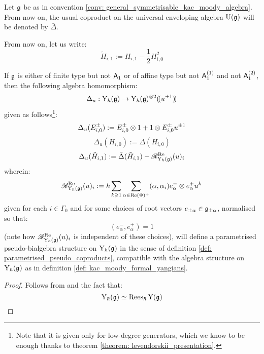             \begin{convention} \label{conv: universal_enveloping_algebra_coproduct}
                Let $\mathfrak{g}$ be as in convention \ref{conv: general_symmetrisable_kac_moody_algebra}. From now on, the usual coproduct on the universal enveloping algebra $\mathrm{U}(\mathfrak{g})$ will be denoted by $\bar{\Delta}$.
            \end{convention}
            \begin{convention}
                From now on, let us write:
                    $$\tilde{H}_{i, 1} := H_{i, 1} - \frac12 H_{i, 0}^2$$
            \end{convention}
            \begin{theorem} \label{theorem: parametrised_pseudo_coproduct_on_formal_yangians}
                If $\mathfrak{g}$ is either of finite type but not $\mathsf{A}_1$ or of affine type but not $\mathsf{A}_1^{(1)}$ and not $\mathsf{A}_1^{(2)}$, then the following algebra homomorphism:
                    $$\Delta_u: \rmY_{\hbar}(\g) \to \rmY_{\hbar}(\g)^{\tensor 2}(\!(u^{\pm 1})\!)$$
                given as follows\footnote{Note that it is given only for low-degree generators, which we know to be enough thanks to theorem \ref{theorem: levendorskii_presentation}.}:
                    $$\Delta_u(E_{i, 0}^{\pm}) := E_{i, 0}^{\pm} \tensor 1 + 1 \tensor E_{i, 0}^{\pm} u^{\pm 1}$$
                    $$\Delta_u(H_{i, 0}) := \bar{\Delta}(H_{i, 0})$$
                    $$\Delta_u(\tilde{H}_{i, 1}) := \bar{\Delta}(\tilde{H}_{i, 1}) - \mathscr{R}_{\mathrm{Y}_{\hbar}(\mathfrak{g})}^{\operatorname{Re}}(u)_i$$
                wherein:
                    $$\scrR_{\rmY_{\hbar}(\g)}^{\Re}(u)_i := \hbar \sum_{k \geq 1} \sum_{\alpha \in \Re(\Phi)^+} (\alpha, \alpha_i) e_{\alpha}^- \tensor e_{\alpha}^+ u^k$$
                given for each $i \in \Gamma_0$ and for some choices of root vectors $e_{\pm\alpha} \in \mathfrak{g}_{\pm\alpha}$, normalised so that:
                    $$(e_{\alpha}^-, e_{\alpha}^+) = 1$$
                (note how $\mathscr{R}_{\mathrm{Y}_{\hbar}(\mathfrak{g})}^{\operatorname{Re}}(u)_i$ is independent of these choices), will define a parametrised pseudo-bialgebra structure on $\mathrm{Y}_{\hbar}(\mathfrak{g})$ in the sense of definition \ref{def: parametrised_pseudo_coproducts}, compatible with the algebra structure on $\mathrm{Y}_{\hbar}(\mathfrak{g})$ as in definition \ref{def: kac_moody_formal_yangians}. 
            \end{theorem}
                \begin{proof}
                    Follows from \cite[Theorem 6.2]{guay_nakajima_wendlandt_affine_yangian_coproduct} and the fact that:
                        $$\mathrm{Y}_{\hbar}(\mathfrak{g}) \simeq \operatorname{Rees}_{\hbar} \mathrm{Y}(\mathfrak{g})$$
                \end{proof}

